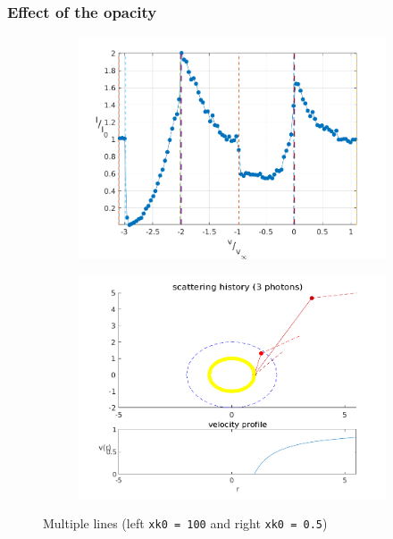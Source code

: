 \documentclass[../main/main.tex]{subfiles}
\begin{document}
\subsubsection{Effect of the opacity}
	\begin{figure}[H]
	\centering	
	\hspace*{-0.5in}
	\begin{subfigure}{.6\textwidth}
	\includegraphics[width=1\textwidth]{../../two_resonance_lines/figures/multiple_lines_distant_diff_opacity.png}
	\end{subfigure}%
	\begin{subfigure}{.6\textwidth}
	\includegraphics[width=1\textwidth]{../../two_resonance_lines/figures/multiple_lines_photon_path_distant_diff_opacity.png}
	\end{subfigure}
	\caption{Multiple lines (left \texttt{xk0 = 100} and right \texttt{xk0 = 0.5})}
	\label{multiple_lines_1_effect_opacity}
	\end{figure}
\end{document}
